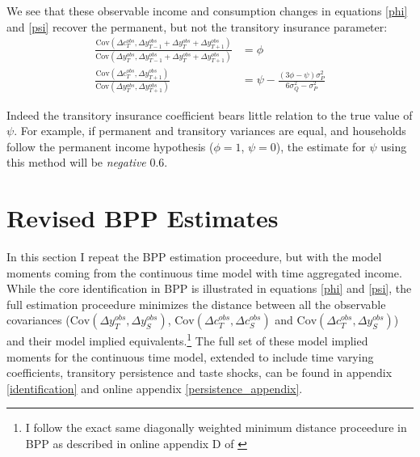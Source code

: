 \documentclass[AER]{AEA}
\begin{document}
We see that these observable income and consumption changes in equations \ref{phi} and \ref{psi} recover the permanent, but not the transitory insurance parameter:
\begin{align}
\frac{\mathrm{Cov}(\Delta c^{obs}_{T}, \Delta y^{obs}_{T-1}+\Delta y^{obs}_{T}+\Delta y^{obs}_{T+1})}{\mathrm{Cov}(\Delta y^{obs}_{T}, \Delta y^{obs}_{T-1}+\Delta y^{obs}_{T}+\Delta y^{obs}_{T+1})}&= \phi\\
\frac{\mathrm{Cov}(\Delta c^{obs}_{T},\Delta y^{obs}_{T+1})}{\mathrm{Cov}(\Delta y^{obs}_{T},\Delta y^{obs}_{T+1})} &= \psi - \frac{ (3\phi - \psi) \sigma^2_P}{6\sigma^2_Q-\sigma^2_P} \label{not_psi}
\end{align}

Indeed the transitory insurance coefficient bears little relation to the true value of $\psi$. For example, if permanent and transitory variances are equal, and households follow the permanent income hypothesis ($\phi=1$, $\psi=0$), the estimate for $\psi$ using this method will be \textit{negative} 0.6.

\section{Revised BPP Estimates} \label{evidence}

In this section I repeat the BPP estimation proceedure, but with the model moments coming from the continuous time model with time aggregated income. While the core identification in BPP is illustrated in equations \ref{phi} and \ref{psi}, the full estimation proceedure minimizes the distance between all the observable covariances ($ \mathrm{Cov}(\Delta y^{obs}_T, \Delta y^{obs}_S)$, $\mathrm{Cov}(\Delta c^{obs}_T, \Delta c^{obs}_S)$ and $\mathrm{Cov}(\Delta c^{obs}_T,  \Delta y^{obs}_S)$) and their model implied equivalents.\footnote{I follow the exact same diagonally weighted minimum distance proceedure in BPP as described in online appendix D of \cite{blundell_consumption_2008}} The full set of these model implied moments for the continuous time model, extended to include time varying coefficients, transitory persistence and taste shocks, can be found in appendix \ref{identification} and online appendix \ref{persistence_appendix}. 


\end{document}
